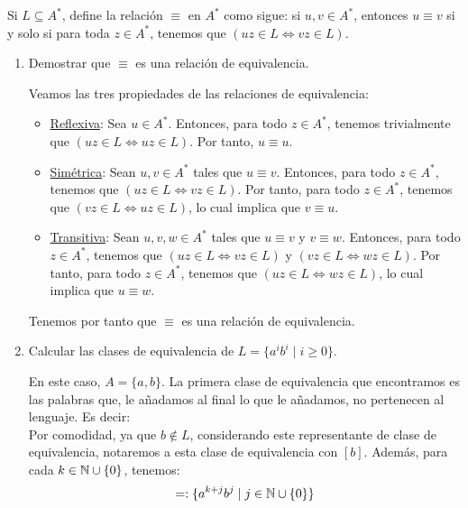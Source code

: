 \begin{ejercicio}
    Si $L \subseteq A^*$, define la relación $\equiv$ en $A^*$ como sigue: si $u, v \in A^*$, entonces $u \equiv v$ si y solo si para toda $z \in A^*$, tenemos que $(uz \in L \Leftrightarrow vz \in L)$.
    \begin{enumerate}
        \item Demostrar que $\equiv$ es una relación de equivalencia.
        
        Veamos las tres propiedades de las relaciones de equivalencia:
        \begin{itemize}
            \item \ul{Reflexiva}: Sea $u\in A^*$. Entonces, para todo $z\in A^*$, tenemos trivialmente que $(uz\in L\Leftrightarrow uz\in L)$. Por tanto, $u\equiv u$.
            \item \ul{Simétrica}: Sean $u,v\in A^*$ tales que $u\equiv v$. Entonces, para todo $z\in A^*$, tenemos que $(uz\in L\Leftrightarrow vz\in L)$. Por tanto, para todo $z\in A^*$, tenemos que $(vz\in L\Leftrightarrow uz\in L)$, lo cual implica que $v\equiv u$.
            \item \ul{Transitiva}: Sean $u,v,w\in A^*$ tales que $u\equiv v$ y $v\equiv w$. Entonces, para todo $z\in A^*$, tenemos que $(uz\in L\Leftrightarrow vz\in L)$ y $(vz\in L\Leftrightarrow wz\in L)$. Por tanto, para todo $z\in A^*$, tenemos que $(uz\in L\Leftrightarrow wz\in L)$, lo cual implica que $u\equiv w$.
        \end{itemize}
        Tenemos por tanto que $\equiv$ es una relación de equivalencia.

        \item Calcular las clases de equivalencia de $L = \{a^ib^i \mid i \geq 0\}$.
        
        En este caso, $A=\{a,b\}$.
        La primera clase de equivalencia que encontramos es las palabras que, le añadamos al final lo que le añadamos, no pertenecen al lenguaje. Es decir:
        \begin{equation*}
            [u\in A^* \mid \text{en $u$ hay una $a$ después de una $b$} \qquad \lor\qquad u=a^ib^j,~j>i]
        \end{equation*}
        Por comodidad, ya que $b\notin L$, considerando este representante de clase de equivalencia, notaremos a esta clase de equivalencia con $[b]$.
        Además, para cada $k\in \mathbb{N}\cup \{0\}$, tenemos:
        \begin{equation*}
            [a_k] =: \{a^{k+j}b^j\mid j\in \bb{N}\cup \{0\}\}
        \end{equation*}


\end{enumerate}
\end{ejercicio}

